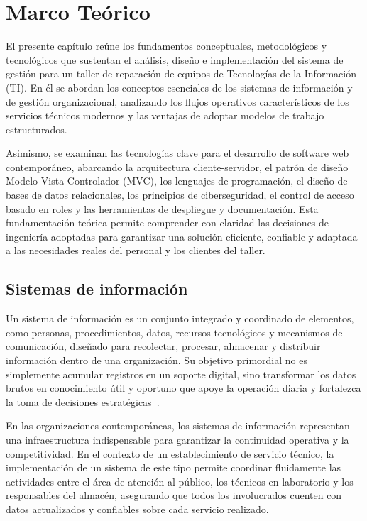 \chapter{Marco Teórico}

El presente capítulo reúne los fundamentos conceptuales, metodológicos y tecnológicos que sustentan el análisis, diseño e implementación del sistema de gestión para un taller de reparación de equipos de Tecnologías de la Información (TI). En él se abordan los conceptos esenciales de los sistemas de información y de gestión organizacional, analizando los flujos operativos característicos de los servicios técnicos modernos y las ventajas de adoptar modelos de trabajo estructurados.

Asimismo, se examinan las tecnologías clave para el desarrollo de software web contemporáneo, abarcando la arquitectura cliente-servidor, el patrón de diseño Modelo-Vista-Controlador (MVC), los lenguajes de programación, el diseño de bases de datos relacionales, los principios de ciberseguridad, el control de acceso basado en roles y las herramientas de despliegue y documentación. Esta fundamentación teórica permite comprender con claridad las decisiones de ingeniería adoptadas para garantizar una solución eficiente, confiable y adaptada a las necesidades reales del personal y los clientes del taller.

\section{Sistemas de información}

Un sistema de información es un conjunto integrado y coordinado de elementos, como personas, procedimientos, datos, recursos tecnológicos y mecanismos de comunicación, diseñado para recolectar, procesar, almacenar y distribuir información dentro de una organización. Su objetivo primordial no es simplemente acumular registros en un soporte digital, sino transformar los datos brutos en conocimiento útil y oportuno que apoye la operación diaria y fortalezca la toma de decisiones estratégicas~\cite{laudon2020management, stair2018principles}.

En las organizaciones contemporáneas, los sistemas de información representan una infraestructura indispensable para garantizar la continuidad operativa y la competitividad. En el contexto de un establecimiento de servicio técnico, la implementación de un sistema de este tipo permite coordinar fluidamente las actividades entre el área de atención al público, los técnicos en laboratorio y los responsables del almacén, asegurando que todos los involucrados cuenten con datos actualizados y confiables sobre cada servicio realizado.

